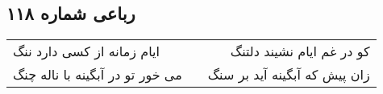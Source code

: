 \begin{center}
\section*{رباعی شماره ۱۱۸}
\label{sec:sh118}
\begin{longtable}{l p{0.5cm} r}
ایام زمانه از کسی دارد ننگ
&&
کو در غم ایام نشیند دلتنگ
\\
می خور تو در آبگینه با ناله چنگ
&&
زان پیش که آبگینه آید بر سنگ
\\
\end{longtable}
\end{center}
